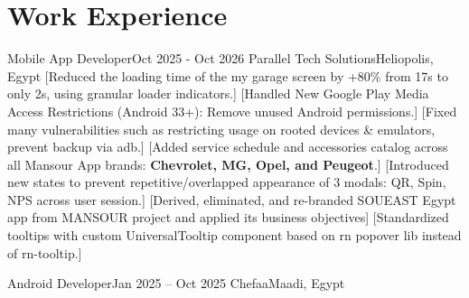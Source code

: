 \documentclass[A4paper, 11pt]{article}
\begin{document}
\workListEnd



\section{Work Experience}

\workListStart

    \experience
        {Mobile App Developer}{Oct 2025 - Oct 2026}
        {Parallel Tech Solutions}{Heliopolis, Egypt}
        {\keyAchievements
            [Reduced the loading time of the my garage screen by +80\% from 17s to only 2s, using granular loader indicators.]
            [Handled New Google Play Media Access Restrictions (Android 33+): Remove unused Android permissions.]
            [Fixed many vulnerabilities such as restricting usage on rooted devices \& emulators, prevent backup via adb.]
            [Added service schedule and accessories catalog across all Mansour App brands: \textbf{Chevrolet, MG, Opel, and Peugeot}.]
            [Introduced new states to prevent repetitive/overlapped appearance of 3 modals: QR, Spin, NPS across user session.]
            [Derived, eliminated, and re-branded SOUEAST Egypt app from MANSOUR project and applied its business objectives]
            [Standardized tooltips with custom UniversalTooltip component based on rn popover lib instead of rn-tooltip.]
        }

    \experience
        {Android Developer}{Jan 2025 – Oct 2025}
        {Chefaa}{Maadi, Egypt}
        {
        }
\end{document}
